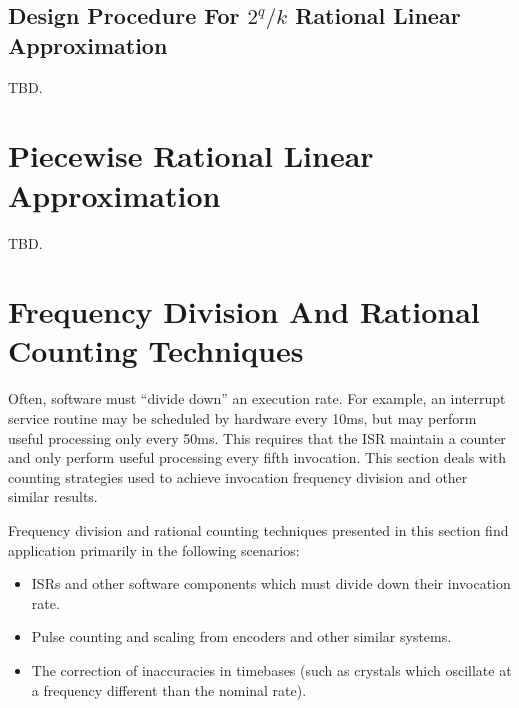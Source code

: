 \subsection[Design Procedure For \protect\mbox{\protect$2^q/k$} Rational Linear Approximations]
           {Design Procedure For \protect\mbox{\protect\boldmath$2^q/k$} Rational Linear Approximation}
\label{crat0:shqq0:dpk0}

TBD.

\section{Piecewise Rational Linear Approximation}
\label{crat0:spwi0}

TBD.

\section[Frequency Division And Rational Counting]
        {Frequency Division And Rational Counting Techniques}
\label{crat0:sfdv0}

%
Often, software must ``divide down'' an execution rate.  For example,
an interrupt service routine may be scheduled by hardware every
10ms, but may perform useful processing only every 50ms.  This requires
that the ISR maintain a counter and only perform useful processing
every fifth invocation.  This section deals with counting strategies
used to achieve invocation frequency division and other similar results.

Frequency division and
rational counting techniques presented in this section find application
primarily in the following scenarios:

\begin{itemize}
\item ISRs and other software components which must divide down
      their invocation rate.
\item Pulse counting and scaling from encoders and other
      similar systems.
\item The correction of inaccuracies in timebases (such as crystals
      which oscillate at a frequency different than the
      nominal rate).
\end{itemize}

